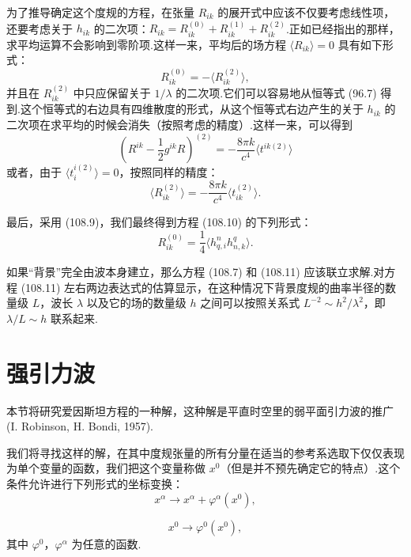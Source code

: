 为了推导确定这个度规的方程，在张量 $R_{ik}$ 的展开式中应该不仅要考虑线性项，还要考虑关于 $h_{ik}$ 的二次项：$R_{ik}=R_{ik}^{(0)}+R_{ik}^{(1)}+R_{ik}^{(2)}$.正如已经指出的那样，求平均运算不会影响到零阶项.这样一来，平均后的场方程 $\langle R_{ik}\rangle=0$ 具有如下形式：
\begin{equation}
  R_{ik}^{(0)}=-\langle R_{ik}^{(2)}\rangle,
\end{equation}
并且在 $R_{ik}^{(2)}$ 中只应保留关于 $1/\lambda$ 的二次项.它们可以容易地从恒等式 (96.7) 得到.这个恒等式的右边具有四维散度的形式，从这个恒等式右边产生的关于 $h_{ik}$ 的二次项在求平均的时候会消失（按照考虑的精度）.这样一来，可以得到
\begin{equation*}
  \left(R^{ik}-\frac{1}{2}g^{ik}R\right)^{(2)}
  =-\frac{8\pi k}{c^{4}}\langle t^{ik(2)}\rangle
\end{equation*}
或者，由于 $\langle t_i^{i(2)}\rangle=0$，按照同样的精度：
\begin{equation*}
  \langle R_{ik}^{(2)}\rangle
  =-\frac{8\pi k}{c^{4}}\langle t_{ik}^{(2)}\rangle.
\end{equation*}

最后，采用 (108.9)，我们最终得到方程 (108.10) 的下列形式：
\begin{equation}
  R_{ik}^{(0)}
  =\frac{1}{4}\langle h_{q,i}^{n}h_{n,k}^{q}\rangle.
\end{equation}

如果“背景”完全由波本身建立，那么方程 (108.7) 和 (108.11) 应该联立求解.对方程 (108.11) 左右两边表达式的估算显示，在这种情况下背景度规的曲率半径的数量级 $L$，波长 $\lambda$ 以及它的场的数量级 $h$ 之间可以按照关系式 $L^{-2}\sim h^{2}/\lambda^{2}$，即 $\lambda/L\sim h$ 联系起来.

\section{强引力波}

本节将研究爱因斯坦方程的一种解，这种解是平直时空里的弱平面引力波的推广 (I. Robinson, H. Bondi, 1957).

我们将寻找这样的解，在其中度规张量的所有分量在适当的参考系选取下仅仅表现为单个变量的函数，我们把这个变量称做 $x^{0}$（但是并不预先确定它的特点）.这个条件允许进行下列形式的坐标变换：
\begin{equation}
  x^{\alpha}\to x^{\alpha}+\varphi^{\alpha}(x^{0}),
\end{equation}

\begin{equation}
  x^{0}\to\varphi^{0}(x^{0}),
\end{equation}
其中 $\varphi^0$，$\varphi^\alpha$ 为任意的函数.

